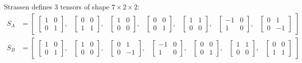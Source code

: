 \documentclass[oneside]{book}
\begin{document}
Strassen defines 3 tensors of shape $7\times 2\times 2$:
\begin{align*}
S_A &= \begin{bmatrix}
\begin{bmatrix}1 & 0\\0 & 1\end{bmatrix}, &
\begin{bmatrix}0 & 0\\1 & 1\end{bmatrix}, &
\begin{bmatrix}1 & 0\\0 & 0\end{bmatrix}, &
\begin{bmatrix}0 & 0\\0 & 1\end{bmatrix}, &
\begin{bmatrix}1 & 1\\0 & 0\end{bmatrix}, &
\begin{bmatrix}-1 & 0\\1 & 0\end{bmatrix}, &
\begin{bmatrix}0 & 1\\0 & -1\end{bmatrix}
\end{bmatrix}
\\
S_B &= \begin{bmatrix}
\begin{bmatrix}1 & 0\\0 & 1\end{bmatrix}, &
\begin{bmatrix}1 & 0\\0 & 0\end{bmatrix}, &
\begin{bmatrix}0 & 1\\0 & -1\end{bmatrix}, &
\begin{bmatrix}-1 & 0\\1 & 0\end{bmatrix}, &
\begin{bmatrix}0 & 0\\0 & 1\end{bmatrix}, &
\begin{bmatrix}1 & 1\\0 & 0\end{bmatrix}, &
\begin{bmatrix}0 & 0\\1 & 1\end{bmatrix}

\end{bmatrix}
\end{align*}
\end{document}
